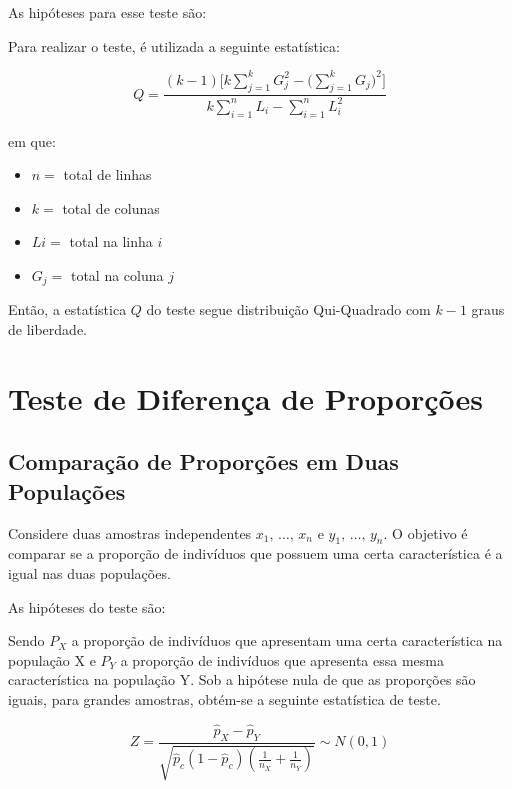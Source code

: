 \documentclass[
]{estat/estat}
\providecommand{\tightlist}{%
  \setlength{\itemsep}{0pt}\setlength{\parskip}{0pt}}\usepackage{longtable,booktabs,array}
\begin{document}
As hipóteses para esse teste são:

Para realizar o teste, é utilizada a seguinte estatística:

\[ Q = \frac{(k - 1) \Bigg[k \displaystyle \sum_{j=1}^{k} G_{j}^{2} - \bigg(\displaystyle \sum_{j=1}^{k} G_{j} \bigg)^{2} \Bigg]}{k \displaystyle \sum_{i=1}^{n} L_{i} - \displaystyle \sum_{i=1}^{n} L_i^{2}} \]

em que:

\begin{itemize}
\tightlist
\item
  \(n =\) total de linhas
\item
  \(k =\) total de colunas
\item
  \(L{i} =\) total na linha \(i\)
\item
  \(G_{j} =\) total na coluna \(j\)
\end{itemize}

Então, a estatística \(Q\) do teste segue distribuição Qui-Quadrado com
\(k - 1\) graus de liberdade.

\section{Teste de Diferença de
Proporções}\label{teste-de-diferenuxe7a-de-proporuxe7uxf5es}

\subsection{Comparação de Proporções em Duas
Populações}\label{comparauxe7uxe3o-de-proporuxe7uxf5es-em-duas-populauxe7uxf5es}

Considere duas amostras independentes \(x_1,\, \ldots , \, x_n\) e
\(y_1,\, \ldots , \, y_n\). O objetivo é comparar se a proporção de
indivíduos que possuem uma certa característica é a igual nas duas
populações.

As hipóteses do teste são:


Sendo \(P_X\) a proporção de indivíduos que apresentam uma certa
característica na população X e \(P_Y\) a proporção de indivíduos que
apresenta essa mesma característica na população Y. Sob a hipótese nula
de que as proporções são iguais, para grandes amostras, obtém-se a
seguinte estatística de teste.

\[Z=\frac{\hat{p}_X-\hat{p}_Y}{\sqrt{\hat{p}_c(1-\hat{p}_c)\left(\frac{1}{n_X}+\frac{1}{n_Y}\right)}} \sim N(0,1)\]
\end{document}
